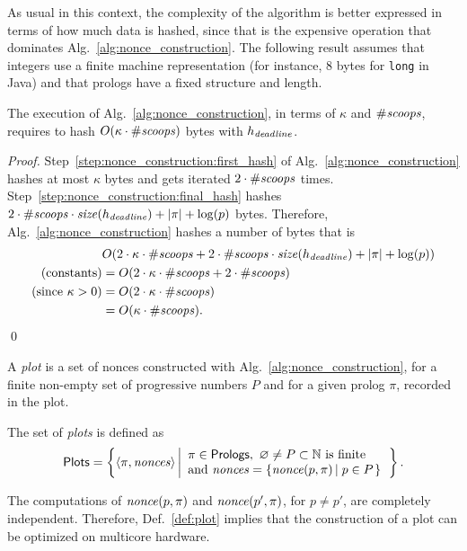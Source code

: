%
As usual in this context, the complexity of the algorithm is better expressed
in terms of how much data is hashed, since that is the expensive operation that dominates
Alg.~\ref{alg:nonce_construction}. The following result assumes that
integers use a finite machine representation (for instance, $8$ bytes for \texttt{long} in Java)
and that prologs have a fixed structure and length.
%
\begin{proposition}\label{prop:nonce_construction_complexity}
  The execution of Alg.~\ref{alg:nonce_construction}, in terms
  of $\kappa$ and ${\#\mathit{scoops}}$, requires to hash
  $O(\kappa\cdot{\#\mathit{scoops}})$ bytes with $h_{\mathit{deadline}}$.
\end{proposition}
\begin{proof}
  Step~\ref{step:nonce_construction:first_hash} of Alg.~\ref{alg:nonce_construction}
  hashes at most $\kappa$ bytes and gets iterated $2\cdot{\#\mathit{scoops}}$ times.
  Step~\ref{step:nonce_construction:final_hash} hashes
  $2\cdot{\#\mathit{scoops}}\cdot{\mathit{size}}(h_{\mathit{deadline}})+|\pi|+\log(p)$ bytes. Therefore,
  Alg.~\ref{alg:nonce_construction} hashes a number of bytes that is
  \begin{align*}
    &O(2\cdot\kappa\cdot{\#\mathit{scoops}}+2\cdot{\#\mathit{scoops}}\cdot{\mathit{size}}(h_{\mathit{deadline}})+|\pi|+\log(p))\\
    \text{(constants)}&=O(2\cdot\kappa\cdot{\#\mathit{scoops}}+2\cdot{\#\mathit{scoops}})\\
    \text{(since $\kappa>0$)}&=O(2\cdot\kappa\cdot{\#\mathit{scoops}})\\
    &=O(\kappa\cdot{\#\mathit{scoops}}).
  \end{align*}
  \qed
\end{proof}
%
A \emph{plot} is a set of nonces constructed with Alg.~\ref{alg:nonce_construction},
for a finite non-empty set of progressive numbers $P$ and
for a given prolog $\pi$, recorded in the plot.
%
\begin{definition}[Plot]\label{def:plot}
  The set of \emph{plots} is defined as
  \[
  {\mathsf{Plots}}=\left\{\left<\pi,{\mathit{nonces}}\right>\left|\begin{array}{l}
  \pi\in{\mathsf{Prologs}},\ \varnothing\not=P\subset\mathbb{N}\text{ is finite}\\
  \text{and }{\mathit{nonces}}=\left\{{\mathit{nonce}}(p,\pi)\left|\;p\in P\right.\right\}
  \end{array}\right.\right\}.
  \]
\end{definition}
%
The computations of ${\mathit{nonce}}(p,\pi)$ and ${\mathit{nonce}}(p',\pi)$, for $p\not=p'$,
are completely independent. Therefore, Def.~\ref{def:plot}
implies that the construction of a plot can be optimized on
multicore hardware.
